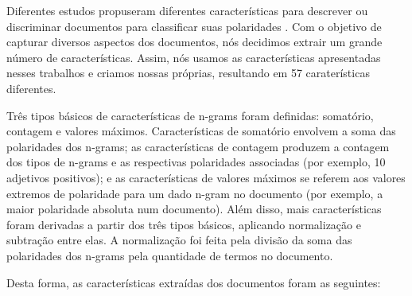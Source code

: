 \documentclass[template.tex]{subfiles}
\begin{document}
Diferentes estudos propuseram diferentes características para descrever ou discriminar documentos para classificar suas polaridades \cite{wilson2005recognizing, ohana2009sentiment, taboada2011lexicon}. Com o objetivo de capturar diversos aspectos dos documentos, nós decidimos extrair um grande número de características. Assim, nós usamos as características apresentadas nesses trabalhos e criamos nossas próprias, resultando em 57 caraterísticas diferentes.

Três tipos básicos de características de n-grams foram definidas: somatório, contagem e valores máximos. Características de somatório envolvem a soma das polaridades dos n-grams; as características de contagem produzem a contagem dos tipos de n-grams e as respectivas polaridades associadas (por exemplo, 10 adjetivos positivos); e as características de valores máximos se referem aos valores extremos de polaridade para um dado n-gram no documento (por exemplo, a maior polaridade absoluta num documento). Além disso, mais características foram derivadas a partir dos três tipos básicos, aplicando normalização e subtração entre elas. A normalização foi feita pela divisão da soma das polaridades dos n-grams pela quantidade de termos no documento.

Desta forma, as características extraídas dos documentos foram as seguintes:
\end{document}
